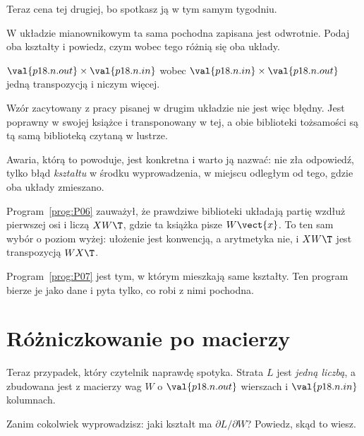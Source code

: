 \begin{fr}
Teraz cena tej drugiej, bo spotkasz ją w tym samym tygodniu.

W układzie mianownikowym ta sama pochodna zapisana jest odwrotnie. Podaj oba
kształty i powiedz, czym wobec tego różnią się oba układy.
\dotline
\nextframe
\end{fr}

\begin{fr}
\begin{ansblock}
$\val{p18.n.out} \times \val{p18.n.in}$ wobec $\val{p18.n.in} \times \val{p18.n.out}$ \dash{} jedną transpozycją
i niczym więcej.
\end{ansblock}

Wzór zacytowany z pracy pisanej w drugim układzie nie jest więc błędny. Jest
poprawny w swojej książce i transponowany w tej, a obie biblioteki tożsamości
są tą samą biblioteką czytaną w lustrze.

Awaria, którą to powoduje, jest konkretna i warto ją nazwać: nie zła
odpowiedź, tylko błąd \emph{kształtu} w środku wyprowadzenia, w miejscu
odległym od tego, gdzie oba układy zmieszano.
\end{fr}

\begin{fr}
\begin{note}
Program~\ref{prog:P06} zauważył, że prawdziwe biblioteki układają partię wzdłuż
pierwszej osi i liczą $XW\T$, gdzie ta książka pisze $W\vect{x}$. To ten sam
wybór o poziom wyżej: ułożenie jest konwencją, a arytmetyka nie, i $XW\T$
jest transpozycją $W X\T$.

Program~\ref{prog:P07} jest tym, w którym mieszkają same kształty. Ten
program bierze je jako dane i pyta tylko, co robi z nimi pochodna.
\end{note}
\end{fr}

\section{Różniczkowanie po macierzy}
\label{sec:P18-by-a-matrix}

\begin{fr}
Teraz przypadek, który czytelnik naprawdę spotyka. Strata $L$ jest
\emph{jedną liczbą}, a zbudowana jest z macierzy wag $W$ o
$\val{p18.n.out}$ wierszach i $\val{p18.n.in}$ kolumnach.

Zanim cokolwiek wyprowadzisz: jaki kształt ma $\partial L / \partial W$?
Powiedz, skąd to wiesz.
\dotline
\nextframe
\end{fr}

